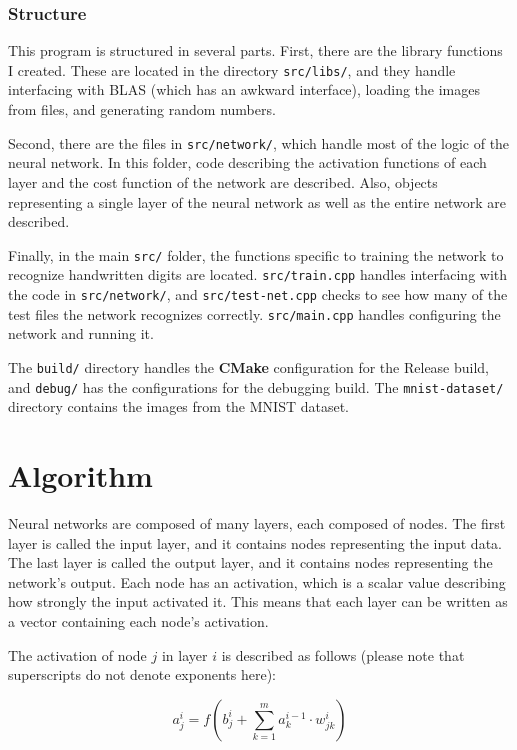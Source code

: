 \documentclass[12pt]{article}
\begin{document}
\subsubsection{Structure}

This program is structured in several parts. 
First, there are the library functions I created.
These are located in the directory \verb|src/libs/|, and they handle interfacing with BLAS (which has an awkward interface), loading the images from files, and generating random numbers.

Second, there are the files in \verb|src/network/|, which handle most of the logic of the neural network.
In this folder, code describing the activation functions of each layer and the cost function of the network are described.
Also, objects representing a single layer of the neural network as well as the entire network are described.

Finally, in the main \verb|src/| folder, the functions specific to training the network to recognize handwritten digits are located.
\verb|src/train.cpp| handles interfacing with the code in \verb|src/network/|, and \verb|src/test-net.cpp| checks to see how many of the test files the network recognizes correctly.
\verb|src/main.cpp| handles configuring the network and running it.

The \verb|build/| directory handles the \textbf{CMake} configuration for the Release build, and \verb|debug/| has the configurations for the debugging build.
The \verb|mnist-dataset/| directory contains the images from the MNIST dataset.

\section{Algorithm}

Neural networks are composed of many layers, each composed of nodes.
The first layer is called the input layer, and it contains nodes representing the input data.
The last layer is called the output layer, and it contains nodes representing the network's output.
Each node has an activation, which is a scalar value describing how strongly the input activated it.
This means that each layer can be written as a vector containing each node's activation.

The activation of node $j$ in layer $i$ is described as follows (please note that superscripts do not denote exponents here):

\[
a_j^i = f\left(b_j^i + \sum_{k = 1}^{m} a_k^{i-1} \cdot w_{jk}^i\right)
\]
\end{document}
